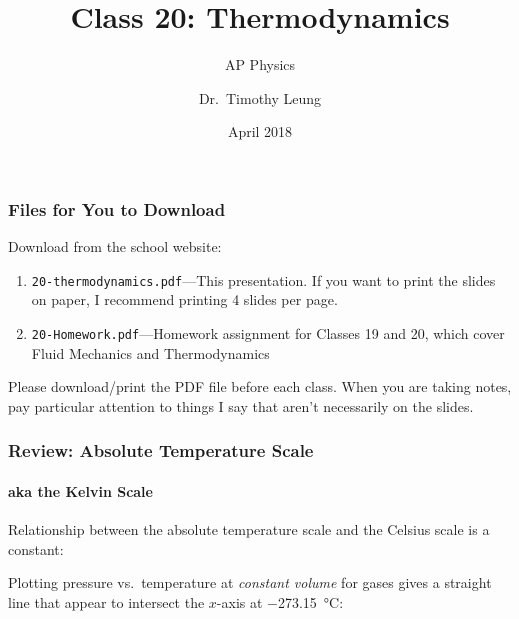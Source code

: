 \documentclass[12pt,aspectratio=169]{beamer}
\title{Class 20: Thermodynamics}
\subtitle{AP Physics}
\author[TML]{Dr.\ Timothy Leung}
\institute{Olympiads School}
\date{April 2018}
\newcommand{\eq}[2]{\vspace{#1}{\Large\begin{displaymath}#2\end{displaymath}}}
\begin{document}
\begin{frame}
  \maketitle
\end{frame}



\begin{frame}
  \frametitle{Files for You to Download}
  Download from the school website:
  \begin{enumerate}
  \item\texttt{20-thermodynamics.pdf}---This presentation. If you want to print
    the slides on paper, I recommend printing 4 slides per page.
  \item\texttt{20-Homework.pdf}---Homework assignment for Classes 19 and 20,
    which cover Fluid Mechanics and Thermodynamics
  \end{enumerate}

  \vspace{.2in}Please download/print the PDF file before each class. When you
  are taking notes, pay particular attention to things I say that aren't
  necessarily on the slides.
\end{frame}



\begin{frame}
  \frametitle{Review: Absolute Temperature Scale}
  \framesubtitle{aka the Kelvin Scale}
  Relationship between the absolute temperature scale and the Celsius scale is
  a constant:
  
  \eq{-.4in}{
    \boxed{T = T_C + 273.15}
  }
  
  \vspace{-.1in}Plotting pressure vs.\ temperature at \emph{constant volume}
  for gases gives a straight line that appear to intersect the $x$-axis at
  \SI{-273.15}{\celsius}:
  \begin{center}
  \end{center}
\end{frame}
\end{document}
